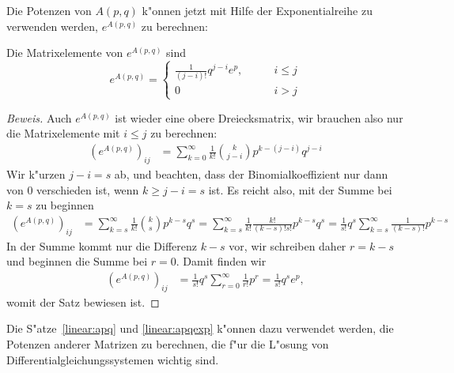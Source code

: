 Die Potenzen von $A(p,q)$ k"onnen jetzt mit Hilfe der Exponentialreihe
zu verwenden werden, $e^{A(p,q)}$ zu berechnen:

\begin{satz}
\label{linear:apqexp}
Die Matrixelemente von $e^{A(p,q)}$ sind 
\[
e^{A(p,q)}
=
\begin{cases}
\frac1{(j-i)!}q^{j-i}e^p,
 &\qquad i\le j\\
0&\qquad i>j
\end{cases}
\]
\end{satz}

\begin{proof}[Beweis]
Auch $e^{A(p,q)}$ ist wieder eine obere Dreiecksmatrix, wir brauchen also
nur die Matrixelemente mit $i\le j$ zu berechnen:
\begin{align*}
(e^{A(p,q)})_{ij}
&=
\sum_{k=0}^\infty \frac1{k!}\binom{k}{j-i}p^{k-(j-i)}q^{j-i}
\end{align*}
Wir k"urzen $j-i=s$ ab, und beachten, dass der Binomialkoeffizient nur
dann von $0$ verschieden ist, wenn $k\ge j-i=s$ ist.
Es reicht also, mit der Summe bei $k=s$ zu beginnen
\begin{align*}
(e^{A(p,q)})_{ij}
&=
\sum_{k=s}^\infty \frac1{k!}\binom{k}{s}p^{k-s}q^s
=
\sum_{k=s}^\infty \frac1{k!}\frac{k!}{(k-s)!s!}p^{k-s}q^s
=
\frac1{s!}q^s \sum_{k=s}^\infty \frac{1}{(k-s)!}p^{k-s}
\end{align*}
In der Summe kommt nur die Differenz $k-s$ vor, wir schreiben
daher $r=k-s$ und beginnen die Summe bei $r=0$.
Damit finden wir
\begin{align*}
(e^{A(p,q)})_{ij}
&=
\frac1{s!}q^s \sum_{r=0}^\infty \frac{1}{r!}p^r
=
\frac1{s!}q^se^p,
\end{align*}
womit der Satz bewiesen ist.
\end{proof}

Die S"atze~\ref{linear:apq} und \ref{linear:apqexp} k"onnen dazu verwendet
werden, die Potenzen anderer Matrizen zu berechnen, die f"ur die L"osung von
Differentialgleichungssystemen wichtig sind.

